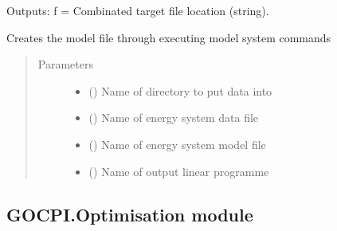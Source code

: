 \documentclass[a4paper,12pt,english]{article}
\begin{document}
\begin{fulllineitems}
\begin{fulllineitems}
Outputs:
f = Combinated target file location (string).

\end{fulllineitems}


\begin{fulllineitems}
\label{\detokenize{GOCPI:GOCPI.Navigation.Navigation.create_linear_programme_file}}
Creates the model file through executing model system commands
\begin{quote}\begin{description}
\item[{Parameters}] \leavevmode\begin{itemize}
\item {} 
 () \textendash{} Name of directory to put data into

\item {} 
 () \textendash{} Name of energy system data file

\item {} 
 () \textendash{} Name of energy system model file

\item {} 
 () \textendash{} Name of output linear programme

\end{itemize}

\end{description}\end{quote}

\end{fulllineitems}


\end{fulllineitems}



\subsection{GOCPI.Optimisation module}
\label{\detokenize{GOCPI:module-GOCPI.Optimisation}}\label{\detokenize{GOCPI:gocpi-optimisation-module}}
\end{document}
